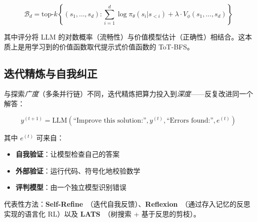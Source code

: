 \begin{equation}
\mathcal{B}_d = \text{top-}k\left\{ (s_1, \ldots, s_d) : \sum_{i=1}^d \log \pi_\theta(s_i | s_{<i}) + \lambda \cdot V_\phi(s_1, \ldots, s_d) \right\}
\end{equation}

其中评分将 LLM 的对数概率（流畅性）与价值模型估计（正确性）相结合。这本质上是用学习到的价值函数取代提示式价值函数的 ToT-BFS。

\subsection{迭代精炼与自我纠正}
\label{iterative-refinement-and-self-correction}

与探索\emph{广度}（多条并行链）不同，迭代精炼把算力投入到\emph{深度}——反复改进同一个解答：

\begin{equation}
y^{(t+1)} = \text{LLM}\!\left(\text{``Improve this solution:''}, y^{(t)}, \text{``Errors found:''}, e^{(t)}\right)
\end{equation}

其中 $e^{(t)}$ 可来自：

\begin{itemize}
  \item \textbf{自我验证}：让模型检查自己的答案
  \item \textbf{外部验证}：运行代码、符号化地校验数学
  \item \textbf{评判模型}：由一个独立模型识别错误
\end{itemize}

代表性方法：\textbf{Self-Refine}~\cite{madaan2023selfrefine}（迭代自我反馈）、\textbf{Reflexion}~\cite{shinn2023reflexion}（通过存入记忆的反思实现的语言化 RL）以及 \textbf{LATS}~\cite{zhou2024lats}（树搜索 + 基于反思的剪枝）。

